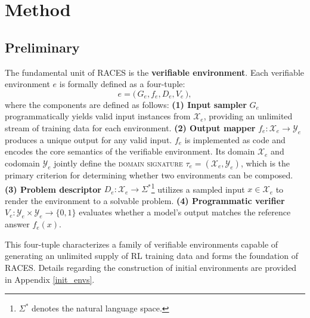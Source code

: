 \section{Method}
\subsection{Preliminary}
\label{sec:atomic}
The fundamental unit of RACES is the \textbf{verifiable environment}. Each verifiable environment $e$ is formally defined as a four-tuple:
\begin{equation}
e = \bigl(\, G_e, f_e, D_e, V_e\,\bigr),
\label{eq:atomic_env}
\end{equation}
where the components are defined as follows: 
\textbf{(1) Input sampler} $G_e$ programmatically yields valid input instances from $\mathcal{X}_e$, providing an unlimited stream of training data for each environment.
\textbf{(2) Output mapper} $f_e : \mathcal{X}_e \to \mathcal{Y}_e$ produces a unique output for any valid input. $f_e$ is implemented as code and encodes the core semantics of the verifiable environment. Its domain $\mathcal{X}_e$ and codomain $\mathcal{Y}_e$ jointly define the \textsc{domain signature} $\tau_e = (\mathcal{X}_e, \mathcal{Y}_e)$, which is the primary criterion for determining whether two environments can be composed.
\textbf{(3) Problem descriptor} $D_e : \mathcal{X}_e \to \Sigma^*$\footnote{$\Sigma^*$ denotes the natural language space.} utilizes a sampled input $x \in \mathcal{X}_e$ to render the environment to a solvable problem.
\textbf{(4) Programmatic verifier} $V_e: \mathcal{Y}_e \times \mathcal{Y}_e \to \{0, 1\}$ evaluates whether a model's output matches the reference answer $f_e(x)$.

This four-tuple characterizes a family of verifiable environments capable of generating an unlimited supply of RL training data and forms the foundation of RACES. Details regarding the construction of initial environments are provided in Appendix \ref{init_envs}.

